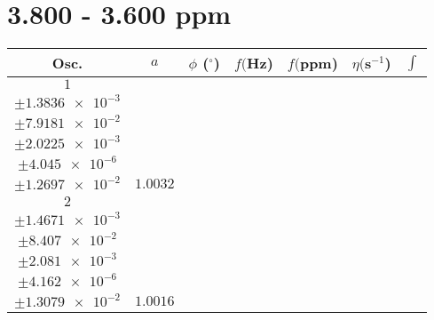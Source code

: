 \documentclass[8pt]{article}
\begin{document}
\section*{3.800 - 3.600 ppm}
\begin{longtable}[l]{c c c c c c c}
\toprule
Osc. & $a$ & $\phi$ ($^{\circ}$) & $f ($Hz) & $f ($ppm) & $\eta ($s$^{-1}$) & $\int$\\
\midrule
$\num{1}$ & \begin{tabular}[c]{@{}c@{}}$\num{1.0015}$ \\ $\pm\num{1.3836e-3}$\end{tabular} & \begin{tabular}[c]{@{}c@{}}$\num{6.6528e-2}$ \\ $\pm\num{7.9181e-2}$\end{tabular} & \begin{tabular}[c]{@{}c@{}}$\num{1.8356e+3}$ \\ $\pm\num{2.0225e-3}$\end{tabular} & \begin{tabular}[c]{@{}c@{}}$\num{3.6712}$ \\ $\pm\num{4.045e-6}$\end{tabular} & \begin{tabular}[c]{@{}c@{}}$\num{7.0086}$ \\ $\pm\num{1.2697e-2}$\end{tabular} & $\num{1.0032}$\\
$\num{2}$ & \begin{tabular}[c]{@{}c@{}}$\num{0.99953}$ \\ $\pm\num{1.4671e-3}$\end{tabular} & \begin{tabular}[c]{@{}c@{}}$\num{-6.1993e-3}$ \\ $\pm\num{8.407e-2}$\end{tabular} & \begin{tabular}[c]{@{}c@{}}$\num{1.8442e+3}$ \\ $\pm\num{2.081e-3}$\end{tabular} & \begin{tabular}[c]{@{}c@{}}$\num{3.6884}$ \\ $\pm\num{4.162e-6}$\end{tabular} & \begin{tabular}[c]{@{}c@{}}$\num{6.9937}$ \\ $\pm\num{1.3079e-2}$\end{tabular} & $\num{1.0016}$\\

\end{longtable}
\end{document}
